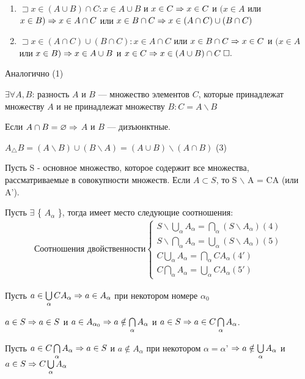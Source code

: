 \documentclass{article}
\begin{document}
\begin{enumerate}
	\item $\sqsupset x \in (A \cup B) \cap C: x \in A \cup B$ и $x \in C \Rightarrow x \in C$ и $(x \in A$ или $x \in B) \Rightarrow x \in A \cap C$ или $x \in B \cap C \Rightarrow x \in (A \cap C) \cup (B \cap C)$

	\item $\sqsupset x \in (A \cap C) \cup (B \cap C): x \in A \cap C$ или $x \in B \cap C \Rightarrow x \in C$ и $(x \in A$ или $x \in B) \Rightarrow x \in A \cup B$ и $x \in C \Rightarrow x \in (A \cup B) \cap C \;\square.$
\end{enumerate}

\proof {}

Аналогично (1)


$\exists \forall A, B$: разность $A$ и $B$ --- множество элементов $C$, которые принадлежат множеству $A$ и не принадлежат множеству $B: C = A \backslash B$


Если $A \cap B = \varnothing \Rightarrow$ $A$ и $B$ --- дизъюнктные.

$A_{\triangle} B = (A \backslash B) \cup (B \backslash A) = (A \cup B) \backslash (A \cap B)$  (3)

Пусть S - основное множество, которое содержит все множества, рассматриваемые в совокупности множеств. Если $A \subset S$, то S $\backslash$ A = CA (или A').

Пусть $\exists$ \{ $A_{\alpha}$ \}, тогда имеет место следующие соотношения:
\begin{align*}
	\text{Соотношения двойственности}
	\begin{cases}
		S \backslash \bigcup\limits_{\alpha} A_\alpha = \bigcap\limits_{\alpha} (S \backslash A_{\alpha})  (4) \\
		S \backslash \bigcap\limits_{\alpha} A_\alpha = \bigcup\limits_{\alpha} (S \backslash A_{\alpha})  (5) \\
		C \bigcup\limits_{\alpha} A_\alpha = \bigcap\limits_{\alpha} C A_{\alpha}   (4')                       \\
		C \bigcap\limits_{\alpha} A_\alpha = \bigcup\limits_{\alpha} C A_{\alpha}   (5')
	\end{cases}
\end{align*}

Пусть $a \in \bigcup\limits_{\alpha} C A_{\alpha} \Rightarrow a \in A_{\alpha}$ при некотором номере $\alpha_{0}$

$a \in S \Rightarrow a \in S$ и $a \in A_{\alpha_{0}} \Rightarrow a \notin \bigcap\limits_{\alpha} A_{\alpha}$ и $a \in S \Rightarrow a \in C \bigcap\limits_{\alpha} A_{\alpha}$.

Пусть $a \in C \bigcap\limits_{\alpha} A_{\alpha} \Rightarrow a \in S$ и $a \notin A_{\alpha}$ при некотором $\alpha = \alpha$' $\Rightarrow a \notin \bigcup\limits_{\alpha} A_{\alpha}$ и $a \in S \Rightarrow C \bigcup\limits_{\alpha} A_{\alpha}$
\end{document}
